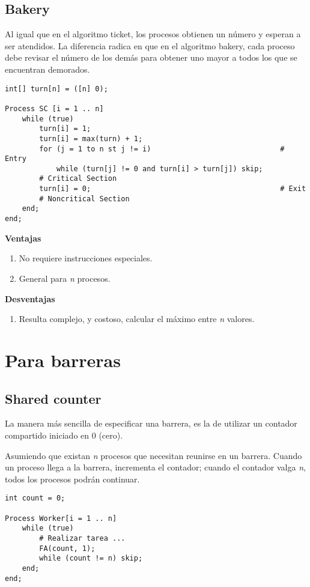 \documentclass[a4paper, 10pt]{report}
\begin{document}
\subsection{Bakery}

Al igual que en el algoritmo ticket, los procesos obtienen un número y esperan a ser atendidos. La diferencia radica en que en el algoritmo bakery, cada proceso debe revisar el número de los demás para obtener uno mayor a todos los que se encuentran demorados.

\begin{lstlisting}
int[] turn[n] = ([n] 0);

Process SC [i = 1 .. n]
	while (true)
		turn[i] = 1; 
		turn[i] = max(turn) + 1;
		for (j = 1 to n st j != i)                              # Entry
			while (turn[j] != 0 and turn[i] > turn[j]) skip;
		# Critical Section
		turn[i] = 0;                                            # Exit
		# Noncritical Section
	end;
end;
\end{lstlisting}

\textbf{Ventajas}
\begin{enumerate}
	\item No requiere instrucciones especiales.
	\item General para \emph{n} procesos.
\end{enumerate}

\textbf{Desventajas}
\begin{enumerate}
	\item Resulta complejo, y costoso, calcular el máximo entre \emph{n} valores.
\end{enumerate}


\section{Para barreras}

\subsection{Shared counter}

La manera más sencilla de especificar una barrera, es la de utilizar un contador compartido iniciado en 0 (cero). 

Asumiendo que existan \emph{n} procesos que necesitan reunirse en un barrera. Cuando un proceso llega a la barrera, incrementa el contador; cuando el contador valga \emph{n}, todos los procesos podrán continuar.

\begin{lstlisting}
int count = 0;

Process Worker[i = 1 .. n]
	while (true)
		# Realizar tarea ...
		FA(count, 1);
		while (count != n) skip;
	end;
end;
\end{lstlisting}
\end{document}

